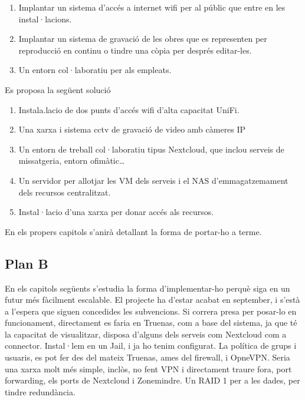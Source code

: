 \documentclass[
  10pt,
]{krantz}
\providecommand{\tightlist}{%
  \setlength{\itemsep}{0pt}\setlength{\parskip}{0pt}}
\begin{document}
\begin{enumerate}
\def\labelenumi{\arabic{enumi}.}
\tightlist
\item
  Implantar un sistema d'accés a internet wifi per al públic que entre en les instal·lacions.
\item
  Implantar un sistema de gravació de les obres que es representen per reproducció en continu o tindre una còpia per després editar-les.
\item
  Un entorn col·laboratiu per als empleats.
\end{enumerate}

Es proposa la següent solució

\begin{enumerate}
\def\labelenumi{\arabic{enumi}.}
\tightlist
\item
  Instala.lacio de dos punts d'accés wifi d'alta capacitat UniFi.
\item
  Una xarxa i sistema cctv de gravació de video amb càmeres IP
\item
  Un entorn de treball col·laboratiu tipus Nextcloud, que inclou serveis de missatgeria, entorn ofimàtic\ldots{}
\item
  Un servidor per allotjar les VM dels serveis i el NAS d'emmagatzemament dels recursos centralitzat.
\item
  Instal·lacio d'una xarxa per donar accés als recursos.
\end{enumerate}

En els propers capitols s'anirà detallant la forma de portar-ho a terme.

\hypertarget{plan-b}{%
\subsection*{Plan B}\label{plan-b}}


En els capitols següents s'estudia la forma d'implementar-ho perquè siga en un futur més fàcilment escalable. El projecte ha d'estar acabat en september, i s'està a l'espera que siguen concedides les subvencions. Si correra presa per posar-lo en funcionament, directament es faria en Truenas, com a base del sistema, ja que té la capacitat de visualitzar, disposa d'alguns dels serveis com Nextcloud com a connector. Instal·lem en un Jail, i ja ho tenim configurat. La política de grups i usuaris, es pot fer des del mateix Truenas, ames del firewall, i OpneVPN. Seria una xarxa molt més simple, inclòs, no fent VPN i directament traure fora, port forwarding, els ports de Nextcloud i Zonemindre. Un RAID 1 per a les dades, per tindre redundància.
\end{document}
